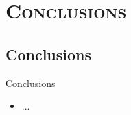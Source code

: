 \section{\scshape Conclusions}
\subsection*{Conclusions}
\begin{frame}{Conclusions}
	\begin{itemize}
		\item ...
	\end{itemize}
\end{frame}